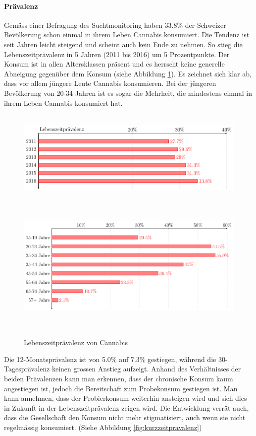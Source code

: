 \documentclass[../main.tex]{subfiles}
\begin{document}
	\paragraph{Prävalenz}	
	Gemäss einer Befragung des Suchtmonitoring haben 33.8\% der Schweizer Bevölkerung schon einmal in ihrem Leben Cannabis konsumiert.
	Die Tendenz ist seit Jahren leicht steigend und scheint auch kein Ende zu nehmen. 
	So stieg die Lebenszeitprävalenz in 5 Jahren (2011 bis 2016) um 5 Prozentpunkte. 
	Der Konsum ist in allen Altersklassen präsent und es herrscht keine generelle Abneigung gegenüber dem Konsum (siehe Abbildung \ref{fig:langzeitpravalenz}). 
	Es zeichnet sich klar ab, dass vor allem jüngere Leute Cannabis konsumieren. 
	Bei der jüngeren Bevölkerung von 20-34 Jahren ist es sogar die Mehrheit, die mindestens einmal in ihrem Leben Cannabis konsumiert hat.	
	
	\noindent	 
	\begin{figure}[H]
		\raggedleft
		\includegraphics[height=4.56cm]{../figures/druguse-longtime}
		\includegraphics[height=6.71cm]{../figures/druguse-longtime-age}
		\captionsetup{font=small}
		\caption[Lebenszeitprävalenz von Cannabis]{Lebenszeitprävalenz von Cannabis\protect\footnotemark}
		\label{fig:langzeitpravalenz}		
	\end{figure}%
	
	
	\noindent
	Die 12-Monatsprävalenz ist von 5.0\% auf 7.3\% gestiegen, während die 30-Tagesprävalenz keinen grossen Anstieg aufzeigt. 
	Anhand des Verhältnisses der beiden Prävalenzen kann man erkennen, dass der chronische Konsum kaum angestiegen ist, jedoch die Bereitschaft zum Probekonsum gestiegen ist. 
	Man kann annehmen, dass der Probierkonsum weiterhin ansteigen wird und sich dies in Zukunft in der Lebenszeitprävalenz zeigen wird.
	Die Entwicklung verrät auch, dass die Gesellschaft den Konsum nicht mehr stigmatisiert, auch wenn sie nicht regelmässig konsumiert.
	(Siehe Abbildung \ref{fig:kurzzeitpravalenz})
	
\end{document}
